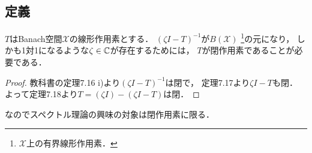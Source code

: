 \documentclass[a4j]{jsarticle}
\newcommand{\spX}{\mathscr{X}}
\begin{document}
    \subsection{定義}
    \begin{Prop}[p.210]
        $T$はBanach空間$\spX$の線形作用素とする．
        $(\zeta I-T)^{-1}$が$B(\spX)$ \footnote{$\spX$上の有界線形作用素．}の元になり，
        しかも1対1になるような$\zeta \in \mathbb{C}$が存在するためには，
        $T$が閉作用素であることが必要である．
    \end{Prop}
    \begin{proof}
        教科書の定理7.16 i)より$(\zeta I-T)^{-1}$は閉で，
        定理7.17より$\zeta I-T$も閉．
        よって定理7.18より$T=(\zeta I)-(\zeta I-T)$は閉．
    \end{proof}
    なのでスペクトル理論の興味の対象は閉作用素に限る．
\end{document}
